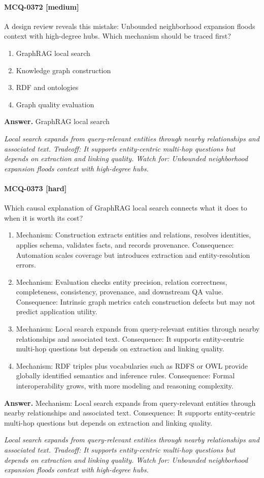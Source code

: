 \paragraph{MCQ-0372 [medium]} A design review reveals this mistake: Unbounded neighborhood expansion floods context with high-degree hubs. Which mechanism should be traced first?
\begin{enumerate}[label=\Alph*.]
\item GraphRAG local search
\item Knowledge graph construction
\item RDF and ontologies
\item Graph quality evaluation
\end{enumerate}
\noindent\textbf{Answer.} GraphRAG local search
\par\textit{Local search expands from query-relevant entities through nearby relationships and associated text. Tradeoff: It supports entity-centric multi-hop questions but depends on extraction and linking quality. Watch for: Unbounded neighborhood expansion floods context with high-degree hubs.}
\paragraph{MCQ-0373 [hard]} Which causal explanation of GraphRAG local search connects what it does to when it is worth its cost?
\begin{enumerate}[label=\Alph*.]
\item Mechanism: Construction extracts entities and relations, resolves identities, applies schema, validates facts, and records provenance. Consequence: Automation scales coverage but introduces extraction and entity-resolution errors.
\item Mechanism: Evaluation checks entity precision, relation correctness, completeness, consistency, provenance, and downstream QA value. Consequence: Intrinsic graph metrics catch construction defects but may not predict application utility.
\item Mechanism: Local search expands from query-relevant entities through nearby relationships and associated text. Consequence: It supports entity-centric multi-hop questions but depends on extraction and linking quality.
\item Mechanism: RDF triples plus vocabularies such as RDFS or OWL provide globally identified semantics and inference rules. Consequence: Formal interoperability grows, with more modeling and reasoning complexity.
\end{enumerate}
\noindent\textbf{Answer.} Mechanism: Local search expands from query-relevant entities through nearby relationships and associated text. Consequence: It supports entity-centric multi-hop questions but depends on extraction and linking quality.
\par\textit{Local search expands from query-relevant entities through nearby relationships and associated text. Tradeoff: It supports entity-centric multi-hop questions but depends on extraction and linking quality. Watch for: Unbounded neighborhood expansion floods context with high-degree hubs.}

